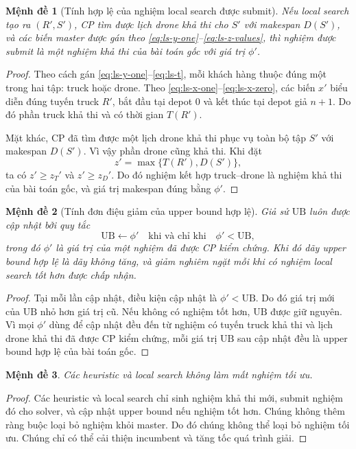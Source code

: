 \documentclass[12pt,a4paper]{article}
\newtheorem{proposition}{Mệnh đề}
\newcommand{\UB}{\mathrm{UB}}
\begin{document}
\begin{proposition}[Tính hợp lệ của nghiệm local search được submit]
Nếu local search tạo ra $(R',S')$, CP tìm được lịch drone khả thi cho $S'$ với makespan $D(S')$, và các biến master được gán theo \eqref{eq:ls-y-one}--\eqref{eq:ls-z-values}, thì nghiệm được submit là một nghiệm khả thi của bài toán gốc với giá trị $\phi'$.
\end{proposition}
\begin{proof}
Theo cách gán \eqref{eq:ls-y-one}--\eqref{eq:ls-t}, mỗi khách hàng thuộc đúng một trong hai tập: truck hoặc drone. Theo \eqref{eq:ls-x-one}--\eqref{eq:ls-x-zero}, các biến $x'$ biểu diễn đúng tuyến truck $R'$, bắt đầu tại depot $0$ và kết thúc tại depot giả $n+1$. Do đó phần truck khả thi và có thời gian $T(R')$.

Mặt khác, CP đã tìm được một lịch drone khả thi phục vụ toàn bộ tập $S'$ với makespan $D(S')$. Vì vậy phần drone cũng khả thi. Khi đặt
\[
    z' = \max\{T(R'),D(S')\},
\]
ta có $z'\ge z_T'$ và $z'\ge z_D'$. Do đó nghiệm kết hợp truck--drone là nghiệm khả thi của bài toán gốc, và giá trị makespan đúng bằng $\phi'$.
\end{proof}

\begin{proposition}[Tính đơn điệu giảm của upper bound hợp lệ]
Giả sử $\UB$ luôn được cập nhật bởi quy tắc
\[
    \UB \leftarrow \phi'
    \quad\text{khi và chỉ khi}\quad
    \phi'<\UB,
\]
trong đó $\phi'$ là giá trị của một nghiệm đã được CP kiểm chứng. Khi đó dãy upper bound hợp lệ là dãy không tăng, và giảm nghiêm ngặt mỗi khi có nghiệm local search tốt hơn được chấp nhận.
\end{proposition}
\begin{proof}
Tại mỗi lần cập nhật, điều kiện cập nhật là $\phi'<\UB$. Do đó giá trị mới của $\UB$ nhỏ hơn giá trị cũ. Nếu không có nghiệm tốt hơn, $\UB$ được giữ nguyên. Vì mọi $\phi'$ dùng để cập nhật đều đến từ nghiệm có tuyến truck khả thi và lịch drone khả thi đã được CP kiểm chứng, mỗi giá trị $\UB$ sau cập nhật đều là upper bound hợp lệ của bài toán gốc.
\end{proof}

\begin{proposition}
Các heuristic và local search không làm mất nghiệm tối ưu.
\end{proposition}
\begin{proof}
Các heuristic và local search chỉ sinh nghiệm khả thi mới, submit nghiệm đó cho solver, và cập nhật upper bound nếu nghiệm tốt hơn. Chúng không thêm ràng buộc loại bỏ nghiệm khỏi master. Do đó chúng không thể loại bỏ nghiệm tối ưu. Chúng chỉ có thể cải thiện incumbent và tăng tốc quá trình giải.
\end{proof}
\end{document}

